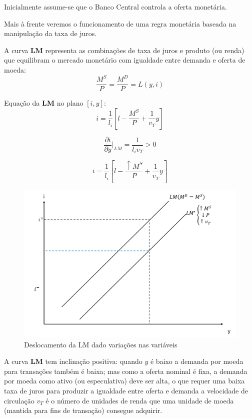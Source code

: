 \documentclass[a4paper,12pt]{article}[abntex2]
\begin{document}
Inicialmente assume-se que o Banco Central controla a oferta monetária.

Mais à frente veremos o funcionamento de uma regra monetária baseada na manipulação da taxa de juros.

A curva \textbf{LM} representa as combinações de taxa de juros e produto (ou renda) que equilibram o mercado monetário com igualdade entre demanda e oferta de moeda:
\[
\frac{M^S}{P} = \frac{M^D}{P} = L(y, i)
\]

Equação da \textbf{LM} no plano $[i, y]$:
\[
i = \frac{1}{l_i} \left[ l - \frac{M^S}{P} + \frac{1}{v_T}y \right]
\]

\[
\frac{\partial i}{\partial y}\bigg|_{LM} = \frac{1}{l_i v_T} > 0
\]

\[
i = \frac{1}{l_i} \left[ l - \frac{\uparrow M^S}{P} + \frac{1}{v_T}y \right]
\]
\begin{figure}[H]
    \centering
    \caption{Deslocamento da LM dado variações nas variáveis}
    \includegraphics[width=0.75\linewidth]{Imagens/a3i4.png}
\end{figure}

A curva \textbf{LM} tem inclinação positiva: quando $y$ é baixo a demanda por moeda para transações também é baixa; mas como a oferta nominal é fixa, a demanda por moeda como ativo (ou especulativa) deve ser alta, o que requer uma baixa taxa de juros para produzir a igualdade entre oferta e demanda a velocidade de circulação $v_T$ é o número de unidades de renda que uma unidade de moeda (mantida para fins de transação) consegue adquirir.
\end{document}
